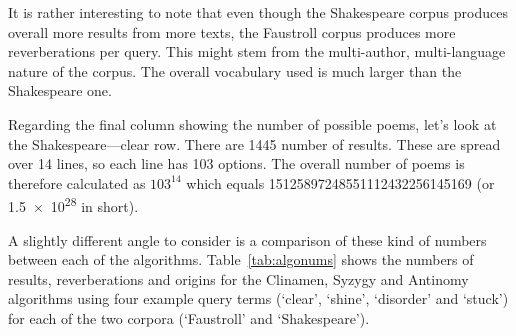It is rather interesting to note that even though the Shakespeare corpus produces overall more results from more texts, the Faustroll corpus produces more reverberations per query. This might stem from the multi-author, multi-language nature of the corpus. The overall vocabulary used is much larger than the Shakespeare one.

Regarding the final column showing the number of possible poems, let's look at the Shakespeare---clear row. There are \num{1445} number of results. These are spread over \num{14} lines, so each line has \num{103} options. The overall number of poems is therefore calculated as $103^{14}$ which equals \num{15125897248551112432256145169} (or \num{1.5e28} in short).

\spirals

A slightly different angle to consider is a comparison of these kind of numbers between each of the algorithms. Table~\ref{tab:algonums} shows the numbers of results, reverberations and origins for the Clinamen, Syzygy and Antinomy algorithms using four example query terms (`clear', `shine', `disorder' and `stuck') for each of the two corpora (`Faustroll' and `Shakespeare').

